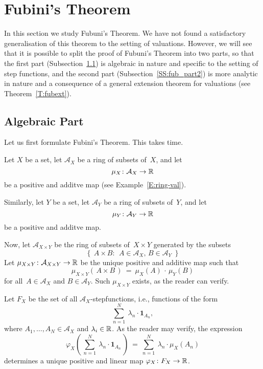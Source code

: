 \documentclass[main.tex]{subfiles}
\begin{document}
\section{Fubini's Theorem}
\label{S:fub}
In this section we study Fubuni's Theorem.
We have not found a satisfactory generalisation of this theorem
to the setting of valuations.
However,
we will see that it is possible to split
the proof of Fubuni's Theorem
into two parts,
so that the first part (Subsection~\ref{SS:fub_part1})
is algebraic in nature
and specific to the setting of step functions,
and the second part (Subsection~\ref{SS:fub_part2}) is more analytic in nature
and a consequence of a
general extension theorem for valuations (see Theorem~\ref{T:fubext}).

\subsection{Algebraic Part}
\label{SS:fub_part1}
Let us first formulate Fubini's Theorem.
This takes time.

Let $X$ be a set,
let $\mathcal{A}_X$ be a ring of subsets of~$X$,
and let 
\begin{equation*}
\mu_X\colon \mathcal{A}_X \rightarrow \mathbb{R}
\end{equation*}
be a positive and additve map
(see Example~\ref{E:ring-val}).

Similarly, let $Y$ be a set,
let $\mathcal{A}_Y$ be a ring of subsets of~$Y$,
and let 
\begin{equation*}
\mu_Y\colon \mathcal{A}_Y \rightarrow \mathbb{R}
\end{equation*}
be a positive and additve map.

Now, let $\mathcal{A}_{X\times Y}$
be the ring of subsets of~$X\times Y$
generated by the subsets
\begin{equation*}
\{\ \  A \times B\colon\ \  \text{$A\in \mathcal{A}_X$, \ \ 
 $B\in\mathcal{A}_Y$} \ \ \}
\end{equation*}
Let $\mu_{X\times Y} \colon \mathcal{A}_{X\times Y} \rightarrow \mathbb{R}$
be the unique positive and additive map such that
\begin{equation*}
\mu_{X\times Y} (\,A\times B\,)
\ =\ \mu_X(A)\,\cdot\,\mu_Y(B)
\end{equation*}
for all~$A\in\mathcal{A}_X$ and $B\in\mathcal{A}_Y$.
Such $\mu_{X\times Y}$ exists,
as the reader can verify.

Let $F_X$ be the set of all $\mathcal{A}_X$-stepfunctions,
i.e., functions of the form
\begin{equation*}
\textstyle{\sum_{n=1}^N \ \lambda_n \cdot \mathbf{1}_{A_n}  },
\end{equation*}
where $A_1,\dotsc,A_N \in\mathcal{A}_X$
and $\lambda_i \in \mathbb{R}$.
As the reader may verify,
the expression
\begin{equation*}
\varphi_X(\,\textstyle{\sum_{n=1}^N \ \lambda_n \cdot \mathbf{1}_{A_n}}\,)
\ =\ \textstyle{\sum_{n=1}^N \ \lambda_n \cdot \mu_X (A_n)}
\end{equation*}
determines a unique positive and linear
map $\varphi_X\colon F_X \rightarrow \mathbb{R}$. 
\end{document}
